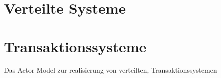 
\chapter{Verteilte Systeme}
\chapter{Transaktionssysteme}
Das Actor Model zur realisierung von verteilten, Transaktionssystemen
